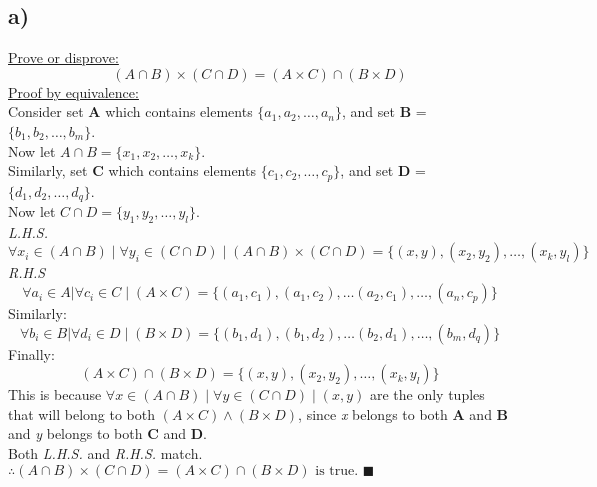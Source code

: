 \documentclass{article}
\begin{document}
\subsection*{a)}
\underline{Prove or disprove:} \[(A \cap B) \times (C \cap D) = (A \times C) \cap (B \times D) \]
\underline{Proof by equivalence:} \\
Consider set \textbf{A} which contains elements $\{ a_1, a_2, \dots, a_n \}$, and set \textbf{B} = $\{ b_1, b_2, \dots, b_m \}$. \\
Now let $A \cap B = \{ x_1, x_2, \dots, x_k \}$. \\
Similarly, set \textbf{C} which contains elements $\{ c_1, c_2, \dots, c_p \}$, and set \textbf{D} = $\{ d_1, d_2, \dots, d_q \}$. \\
Now let $C \cap D = \{ y_1, y_2, \dots, y_l \}$. \\
\textit{L.H.S.} \\
\[
    \forall x_i \in (A \cap B) \mid \forall y_i \in (C \cap D) \mid (A \cap B) \times (C \cap D) = \{ (x, y), (x_2, y_2), \dots, (x_k, y_l) \}
\]
\textit{R.H.S} \\
\[
    \forall a_i \in A | \forall c_i \in C \mid (A \times C) = \{ (a_1, c_1), (a_1, c_2), \dots (a_2, c_1), \dots, (a_n, c_p) \}
\]
Similarly: \\
\[
    \forall b_i \in B | \forall d_i \in D \mid (B \times D) = \{ (b_1, d_1), (b_1, d_2), \dots (b_2, d_1), \dots, (b_m, d_q) \}
\]
Finally: \\
\[
    (A \times C) \cap (B \times D) = \{ (x, y), (x_2, y_2), \dots, (x_k, y_l) \}
\]
This is because $\forall x \in (A \cap B) \mid \forall y \in (C \cap D) \mid (x, y)$ are the only tuples that will belong to both $(A \times C) \land (B \times D)$,
since \textit{x} belongs to both \textbf{A} and \textbf{B} and \textit{y} belongs to both \textbf{C} and \textbf{D}. \\
Both \textit{L.H.S.} and \textit{R.H.S.} match. \\
$\therefore (A \cap B) \times (C \cap D) = (A \times C) \cap (B \times D) \text{ is true. } \blacksquare $ \\
\end{document}
